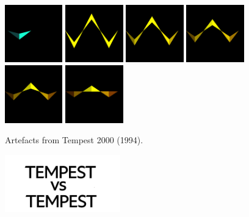 \begin{figure}[H]
\includegraphics[width=2.5cm]{preface/obj2d/obj_4.png}
\includegraphics[width=2.5cm]{preface/obj2d/obj_5.png}
\includegraphics[width=2.5cm]{preface/obj2d/obj_6.png}
\includegraphics[width=2.5cm]{preface/obj2d/obj_7.png}
\includegraphics[width=2.5cm]{preface/obj2d/obj_8.png}
\includegraphics[width=2.5cm]{preface/obj2d/obj_9.png}
  \caption*{Artefacts from Tempest 2000 (1994).}
\end{figure}
\vspace*{\fill}
\begin{figure}[H]
    \centering
      \includegraphics[width=5cm]{src/cover/title_page.png}%
\end{figure}
\vspace*{\fill}
\thispagestyle{empty}%
\clearpage

